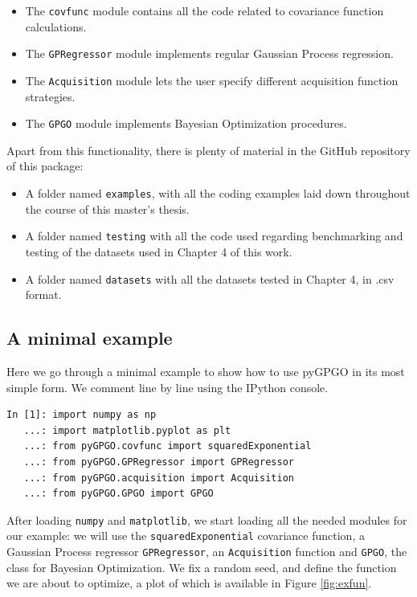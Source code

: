 \documentclass[10pt,a4paper,twoside]{book}
\begin{document}
\begin{itemize}
\item The \texttt{covfunc} module contains all the code related to covariance function calculations. 
\item The \texttt{GPRegressor} module implements regular Gaussian Process regression.
\item The \texttt{Acquisition} module lets the user specify different acquisition function strategies.
\item The \texttt{GPGO} module implements Bayesian Optimization procedures. 
\end{itemize}

Apart from this functionality, there is plenty of material in the GitHub repository of this package:

\begin{itemize}
\item A folder named \texttt{examples}, with all the coding examples laid down throughout the course of this master's thesis.
\item A folder named \texttt{testing} with all the code used regarding benchmarking and testing of the datasets used in Chapter 4 of this work.
\item A folder named \texttt{datasets} with all the datasets tested in Chapter 4, in .csv format. 
\end{itemize}

\subsection{A minimal example}

Here we go through a minimal example to show how to use pyGPGO in its most simple form. We comment line by line using the IPython console.

\begin{verbatim}
In [1]: import numpy as np
   ...: import matplotlib.pyplot as plt
   ...: from pyGPGO.covfunc import squaredExponential
   ...: from pyGPGO.GPRegressor import GPRegressor
   ...: from pyGPGO.acquisition import Acquisition
   ...: from pyGPGO.GPGO import GPGO               
\end{verbatim}

After loading \texttt{numpy} and \texttt{matplotlib}, we start loading all the needed modules for our example: we will use the \texttt{squaredExponential} covariance function, a Gaussian Process regressor \texttt{GPRegressor}, an \texttt{Acquisition} function and \texttt{GPGO}, the class for Bayesian Optimization. We fix a random seed, and define the function we are about to optimize, a plot of which is available in Figure \ref{fig:exfun}.
\end{document}
